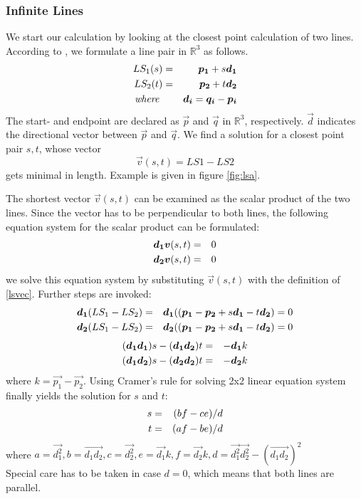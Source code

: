 \subsubsection*{Infinite Lines}
We start our calculation by looking at the closest point calculation of two lines. According to \cite{Ericson:2004:RCD:1121584}, we formulate a line pair in $\mathbb{R}^3$ as follows.
\begin{eqnarray} \label{eqnline}
LS_1(s) &=& \vec{p_1} + s\vec{d_1} \notag\\
LS_2(t) &=& \vec{p_2} + t\vec{d_2}\notag \\
\textit{where } && \vec{d_i} = \vec{q_i} - \vec{p_i}
\end{eqnarray}
The start- and endpoint are declared as $\vec{p}$ and $\vec{q}$ in $\mathbb{R}^3$, respectively. $\vec{d}$ indicates the directional vector between $\vec{p}$ and $\vec{q}$. We find a solution for a closest point pair $s,t$, whose vector 
\begin{equation}\label{lsvec}
\vec{v}(s,t) = LS1-LS2
\end{equation}
gets minimal in length. Example is given in figure \ref{fig:lsa}.

The shortest vector $\vec{v}(s,t)$ can be examined as the scalar product of the two lines. Since the vector has to be perpendicular to both lines, the following equation system for the scalar product can be formulated:
\begin{eqnarray}
\vec{d_1} \vec{v}(s,t)&=& 0  \notag \\
\vec{d_2} \vec{v}(s,t)&=& 0  
\end{eqnarray}
we solve this equation system by substituting $\vec{v}(s,t)$ with the definition of \ref{lsvec}. Further steps are invoked:
\begin{eqnarray}
\vec{d_1} (LS_1-LS_2) &=& \vec{d_1} ((\vec{p_1}-\vec{p_2}+s\vec{d_1}- t\vec{d_2}) = 0  \notag \\
\vec{d_2} (LS_1-LS_2) &=& \vec{d_2} ((\vec{p_1}-\vec{p_2}+s\vec{d_1}- t\vec{d_2}) = 0
\end{eqnarray}
\begin{eqnarray}
(\vec{d_1}\vec{d_1})s - (\vec{d_1}\vec{d_2})t &=& -\vec{d_1}k \notag \\
(\vec{d_1}\vec{d_2})s - (\vec{d_2}\vec{d_2})t &=& -\vec{d_2}k
\end{eqnarray}
where $k= \vec{p_1}-\vec{p_2}$.
Using Cramer's rule \cite{cramer1750introduction} for solving 2x2 linear equation system finally yields the solution for $s$ and $t$:
\begin{eqnarray}
s&=& (b f - c e) / d \notag \\
t &=& (a f - b e) / d 
\end{eqnarray}
where $a = \vec{d_1^2}, b = \vec{d_1 d_2}, c = \vec{d_2^2}, e = \vec{d_1}k, f = \vec{d_2}k, d=  \vec{d_1^2}\vec{d_2^2}- (\vec{d_1 d_2})^2$ \\
Special care has to be taken in case $d=0$, which means that both lines are parallel.

